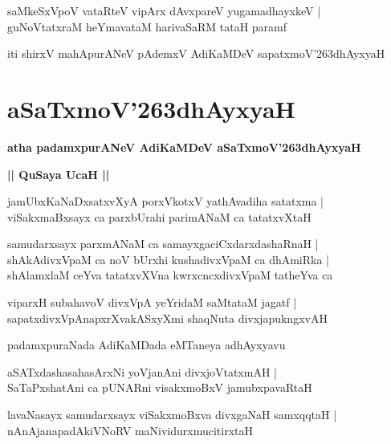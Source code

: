 \documentclass[twoside,12pt,openright]{book}
\def\S{\char'263}
\newcounter{shloka}[chapter]
\def\uvaca#1{\centerline{{\large\textbf{#1}}}}
\begin{document}
\begin{shloka}
saMkeSxVpoV vataRteV vipArx dAvxpareV  yugamadhayxkeV |\\
guNoVtatxraM heYmavataM harivaSaRM tataH paramf
\end{shloka}

\begin{center}
iti shirxV mahApurANeV pAdemxV AdiKaMDeV sapatxmoV\S dhAyxyaH
\end{center}

\chapter{aSaTxmoV\S dhAyxyaH}

\begin{center}
{\LARGE\bfseries atha padamxpurANeV AdiKaMDeV aSaTxmoV\S dhAyxyaH}
\end{center}

\uvaca{|| QuSaya UcaH ||}

\begin{shloka}
jamUbxKaNaDxsatxvXyA porxVkotxV yathAvadiha satatxma |\\
viSakxmaBxsayx ca parxbUrahi parimANaM ca tatatxvXtaH 
\end{shloka}

\begin{shloka}
samudarxsayx parxmANaM ca samayxgaciCxdarxdashaRnaH |\\
shAkAdivxVpaM ca noV bUrxhi kushadivxVpaM ca dhAmiRka |\\
shAlamxlaM ceYva tatatxvXVna kwrxcncxdivxVpaM tatheYva ca
\end{shloka}

\begin{shloka}
viparxH subahavoV divxVpA yeYridaM saMtataM jagatf |\\
sapatxdivxVpAnapxrXvakASxyXmi shaqNuta divxjapukngxvAH
\end{shloka}

\begin{center}
padamxpuraNada AdiKaMDada eMTaneya adhAyxyavu
\end{center}

\begin{shloka}
aSATxdashasahasArxNi yoVjanAni divxjoVtatxmAH |\\
SaTaPxshatAni ca pUNARni visakxmoBxV jamubxpavaRtaH 
\end{shloka}

\begin{shloka}
lavaNasayx samudarxsayx viSakxmoBxva divxgaNaH samxqqtaH |\\
nAnAjanapadAkiVNoRV maNividurxmucitirxtaH
\end{shloka}
\end{document}
